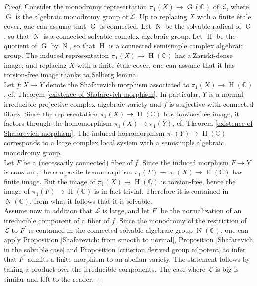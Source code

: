\documentclass[11pt,letterpaper]{amsart}
\def\bC{\mathbb{C}}
\def\cL{\mathcal{L}}
\theoremstyle{plain}
\DeclareMathOperator{\rG}{G}
\DeclareMathOperator{\rH}{H}
\DeclareMathOperator{\rN}{N}
\begin{document}
\begin{proof}
Consider the monodromy representation $\pi_1(X) \to \rG(\bC)$ of $\cL$,  where $\rG$ is the algebraic monodromy group of $\cL$. Up to replacing $X$ with a finite étale cover, one can assume that $\rG$ is connected. Let $\rN$ be the solvable radical of $\rG$, so that $\rN$ is a connected solvable complex algebraic group. Let $\rH$ be the quotient of $\rG$ by $\rN$, so that $\rH$ is a connected semisimple complex algebraic group. The induced representation $\pi_1(X) \to \rH(\bC)$ has a Zariski-dense image, and replacing $X$ with a finite étale cover, one can assume that it has torsion-free image thanks to Selberg lemma. \\
Let $f \colon X \to Y$ denote the Shafarevich morphism associated to $\pi_1(X) \to \rH(\bC)$, cf. Theorem \ref{existence of Shafarevich morphism}. In particular, $Y$ is a normal irreducible projective complex algebraic variety and $f$ is surjective with connected fibres.
Since the representation $\pi_1(X) \to \rH(\bC)$ has torsion-free image, it factors through the homomorphism $\pi_1(X) \to \pi_1(Y)$, cf. Theorem \ref{existence of Shafarevich morphism}. The induced homomorphism $\pi_1(Y) \to \rH(\bC)$ corresponds to a large complex local system with a semisimple algebraic monodromy group.\\
Let $F$ be a (necessarily connected) fiber of $f$. Since the induced morphism $F \to Y$ is constant, the composite homomorphism $\pi_1(F) \to \pi_1(X) \to \rH(\bC)$ has finite image. But the image of $\pi_1(X) \to \rH(\bC)$ is torsion-free, hence the image of $\pi_1(F) \to \rH(\bC)$ is in fact trivial. Therefore it is contained in $\rN(\bC)$, from what it follows that it is solvable.\\
Assume now in addition that $\cL$ is large, and let $F^\prime$ be the normalization of an irreducible component of a fiber of $f$. Since the monodromy of the restriction of $\cL$ to $F^\prime$ is contained in the connected solvable algebraic group $\rN(\bC)$, one can apply Proposition \ref{Shafarevich: from smooth to normal}, Proposition \ref{Shafarevich in the solvable case} and Proposition \ref{criterion derived group nilpotent} to infer that $F^\prime$ admits a finite morphism to an abelian variety. The statement follows by taking a product over the irreducible components. The case where $\cL$ is big is similar and left to the reader.
\end{proof}



\end{document}
